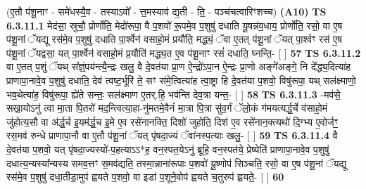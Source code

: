 \documentclass[17pt]{extarticle}
\begin{document}
                  \newline
                      (ए॒तौ प॑शू॒नाꣳ - समे॑धस्यै॒व - तस्याऽवो᳚ - त्त॒मस्याव॑ द्य॒ती - ति॒ - पञ्च॑चत्वारिꣳशच्च)  \textbf{(A10)} \newline \newline
                                        \textbf{ TS 6.3.11.1} \newline
                  मेद॑सा॒ स्रुचौ॒ प्रोर्णो॑ति॒ मेदो॑रूपा॒ वै प॒शवो॑ रू॒पमे॒व प॒शुषु॑ दधाति यू॒षन्न॑व॒धाय॒ प्रोर्णो॑ति॒ रसो॒ वा ए॒ष प॑शू॒नां ॅयद्यू रस॑मे॒व प॒शुषु॑ दधाति पा॒र्श्वेन॑ वसाहो॒मं प्रयौ॑ति॒ मद्ध्यं॒ ॅवा ए॒तत् प॑शू॒नां ॅयत् पा॒र्श्वꣳ रस॑ ए॒ष प॑शू॒नां ॅयद्वसा॒ यत् पा॒र्श्वेन॑ वसाहो॒मं प्र॒यौति॑ मद्ध्य॒त ए॒व प॑शू॒नाꣳ रसं॑ दधाति॒ घ्नन्ति॒- [  ] \textbf{  57} \newline
                  \newline
                                \textbf{ TS 6.3.11.2} \newline
                  वा ए॒तत् प॒शुं ॅयथ् स᳚ज्ञ्ं॒पय॑न्त्यै॒न्द्रः खलु॒ वै दे॒वत॑या प्रा॒ण ऐ॒न्द्रो॑ऽपा॒न ऐ॒न्द्रः प्रा॒णो अङ्गे॑अङ्गे॒ नि दे᳚द्ध्य॒दित्या॑ह प्राणापा॒नावे॒व प॒शुषु॑ दधाति॒ देव॑ त्वष्ट॒र्भूरि॑ ते॒ सꣳ स॑मे॒त्वित्या॑ह त्वा॒ष्ट्रा हि दे॒वत॑या प॒शवो॒ विषु॑रूपा॒ यथ् सल॑क्ष्माणो॒ भव॒थेत्या॑ह॒ विषु॑रूपा॒ ह्ये॑ते सन्तः॒ सल॑क्ष्माण ए॒तर्.हि॒ भव॑न्ति देव॒त्रा यन्त॒- [  ] \textbf{  58} \newline
                  \newline
                                \textbf{ TS 6.3.11.3} \newline
                  -मव॑से॒ सखा॒योऽनु॑ त्वा मा॒ता पि॒तरो॑ मद॒न्त्वित्या॒हा-नु॑मतमे॒वैनं॑ मा॒त्रा पि॒त्रा सु॑व॒र्गं ॅलो॒कं ग॑मयत्यर्द्ध॒र्चे व॑साहो॒मं जु॑होत्य॒सौ वा अ॑र्द्ध॒र्च इ॒यम॑र्द्ध॒च इ॒मे ए॒व रसे॑नानक्ति॒ दिशो॑ जुहोति॒ दिश॑ ए॒व रसे॑नान॒क्त्यथो॑ दि॒ग्भ्य ए॒वोर्जꣳ॒॒ रस॒मव॑ रुन्धे प्राणापा॒नौ वा ए॒तौ प॑शू॒नां ॅयत् पृ॑षदा॒ज्यं ॅवा॑नस्प॒त्याः खलु॒- [  ] \textbf{  59} \newline
                  \newline
                                \textbf{ TS 6.3.11.4} \newline
                  वै दे॒वत॑या प॒शवो॒ यत् पृ॑षदा॒ज्यस्यो॑-प॒हत्याऽऽ*ह॒ वन॒स्पत॒येऽनु॑ ब्रूहि॒ वन॒स्पत॑ये॒ प्रेष्येति॑ प्राणापा॒नावे॒व प॒शुषु॑ दधात्य॒न्यस्या᳚न्यस्य समव॒त्तꣳ स॒मव॑द्यति॒ तस्मा॒न्नाना॑रूपाः प॒शवो॑ यू॒ष्णोप॑ सिञ्चति॒ रसो॒ वा ए॒ष प॑शू॒नां ॅयद्यू रस॑मे॒व प॒शुषु॑ दधा॒तीडा॒मुप॑ ह्वयते प॒शवो॒ वा इडा॑ प॒शूने॒वोप॑ ह्वयते च॒तुरुप॑ ह्वयते॒- [  ] \textbf{  60} \newline
\end{document}
